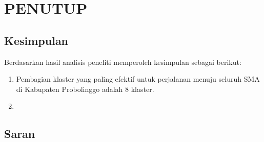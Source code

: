 \chapter{PENUTUP}

\section{Kesimpulan}

Berdasarkan hasil analisis peneliti memperoleh kesimpulan sebagai berikut:

\begin{enumerate}
\item Pembagian klaster yang paling efektif untuk perjalanan menuju seluruh SMA di Kabupaten Probolinggo adalah 8 klaster.
\item 
\end{enumerate}

\section{Saran}